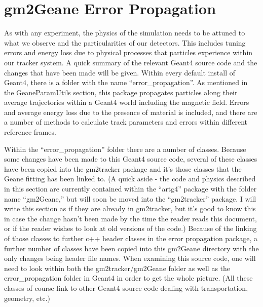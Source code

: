\section{gm2Geane Error Propagation}
\label{sec:gm2Geane}


	As with any experiment, the physics of the simulation needs to be attuned to what we observe and the particularities of our detectors. This includes tuning errors and energy loss due to physical processes that particles experience within our tracker system. A quick summary of the relevant Geant4 source code and the changes that have been made will be given. Within every default install of Geant4, there is a folder with the name ``error\_propagation''. As mentioned in the \hyperref[sec:GeaneParamUtils]{GeaneParamUtils} section, this package propagates particles along their average trajectories within a Geant4 world including the magnetic field. Errors and average energy loss due to the presence of material is included, and there are a number of methods to calculate track parameters and errors within different reference frames.

	Within the ``error\_propagation'' folder there are a number of classes. Because some changes have been made to this Geant4 source code, several of these classes have been copied into the gm2tracker package and it's those classes that the Geane fitting has been linked to. (A quick aside - the code and physics described in this section are currently contained within the ``artg4'' package with the folder name ``gm2Geane,'' but will soon be moved into the ``gm2tracker'' package. I will write this section as if they are already in gm2tracker, but it's good to know this in case the change hasn't been made by the time the reader reads this document, or if the reader wishes to look at old versions of the code.) Because of the linking of those classes to further c++ header classes in the error propagation package, a further number of classes have been copied into this gm2Geane directory with the only changes being header file names. When examining this source code, one will need to look within both the gm2tracker/gm2Geane folder as well as the error\_propagation folder in Geant4 in order to get the whole picture. (All these classes of course link to other Geant4 source code dealing with transportation, geometry, etc.)

